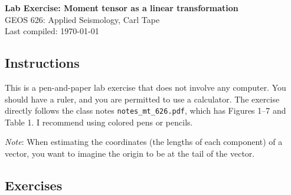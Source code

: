 \documentclass[11pt,titlepage,fleqn]{article}
\newcommand{\mtfile}{\texttt{notes\_mt\_626.pdf}}
\begin{document}

\begin{spacing}{1.2}
\centering
{\large \bf Lab Exercise: Moment tensor as a linear transformation} \\
GEOS 626: Applied Seismology, Carl Tape \\
Last compiled: \today
\end{spacing}


\subsection*{Instructions}

This is a pen-and-paper lab exercise that does not involve any computer. You should have a ruler, and you are permitted to use a calculator. The exercise directly follows the class notes \mtfile, which has Figures 1--7 and Table 1. I recommend using colored pens or pencils.

\medskip\noindent
{\em Note}: When estimating the coordinates (\ie the lengths of each component) of a vector, you want to imagine the origin to be at the tail of the vector. 


\subsection*{Exercises}
\end{document}
